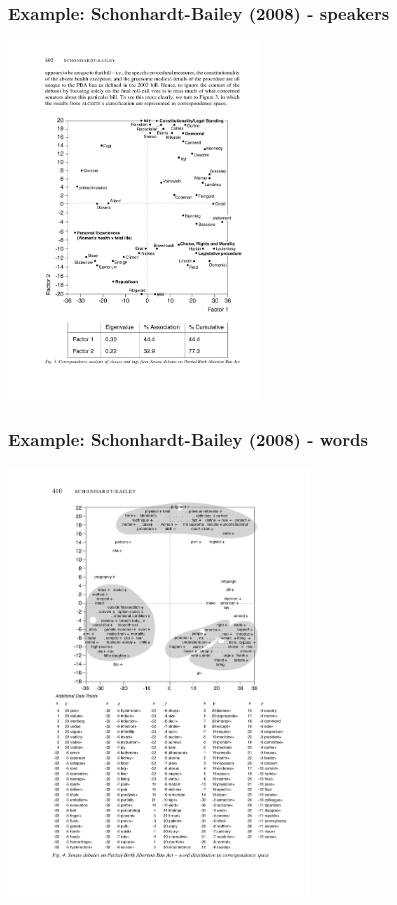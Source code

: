 \documentclass{beamer}
\begin{document}
\begin{frame}
	\frametitle{Example: Schonhardt-Bailey (2008) - speakers}
	\begin{center}
		\includegraphics[width=6.7cm]{figures/SBca.pdf}
	\end{center}
\end{frame}

\begin{frame}
	\frametitle{Example: Schonhardt-Bailey (2008) - words}
	\begin{center}
		\includegraphics[width=8cm]{figures/SBca2.pdf}
	\end{center}
\end{frame}
\end{document}
